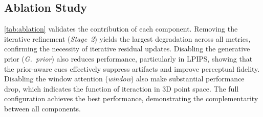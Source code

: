 \subsection{Ablation Study}
\cref{tab:ablation} validates the contribution of each component. 
Removing the iterative refinement (\emph{\wo Stage~2}) yields the largest degradation across all metrics, confirming the necessity of iterative residual updates.
Disabling the generative prior (\emph{\wo G.~prior}) also reduces performance, particularly in LPIPS, showing that the prior-aware cues effectively suppress artifacts and improve perceptual fidelity.
Disabling the window attention (\emph{\wo window}) also make substantial performance drop, which indicates the function of iteraction in 3D point space.
The full configuration achieves the best performance, demonstrating the complementarity between all components.
\begin{table}[htbp]
\centering
\footnotesize
\setlength{\tabcolsep}{3pt}
\renewcommand{\arraystretch}{1}
\caption{\textbf{Ablation study. } We ablate the iterative refinement module (\wo Refinement), the window attention (\wo window att.), and the generative prior (\wo Gen. prior) from our full model, respectively. The full configuration achieves the best performance across all metrics.
The \textbf{best} and \underline{second-best} results are highlighted.}
\label{tab:ablation}
\end{table}





